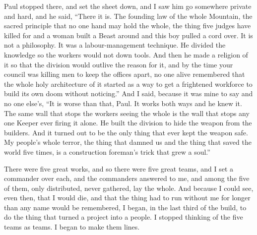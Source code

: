 \ornament

Paul stopped there, and set the sheet down, and I saw him go somewhere private and hard, and he said, ``There it is. The founding law of the whole Mountain, the sacred principle that no one hand may hold the whole, the thing five judges have killed for and a woman built a Beast around and this boy pulled a cord over. It is not a philosophy. It was a labour-management technique. He divided the knowledge so the workers would not down tools. And then he made a religion of it so that the division would outlive the reason for it, and by the time your council was killing men to keep the offices apart, no one alive remembered that the whole holy architecture of it started as a way to get a frightened workforce to build its own doom without noticing.'' And I said, because it was mine to say and no one else's, ``It is worse than that, Paul. It works both ways and he knew it. The same wall that stops the workers seeing the whole is the wall that stops any one Keeper ever firing it alone. He built the division to hide the weapon from the builders. And it turned out to be the only thing that ever kept the weapon safe. My people's whole terror, the thing that damned us and the thing that saved the world five times, is a construction foreman's trick that grew a soul.''\par

\ornament

There were five great works, and so there were five great teams, and I set a commander over each, and the commanders answered to me, and among the five of them, only distributed, never gathered, lay the whole. And because I could see, even then, that I would die, and that the thing had to run without me for longer than any name would be remembered, I began, in the last third of the build, to do the thing that turned a project into a people. I stopped thinking of the five teams as teams. I began to make them lines.\par

